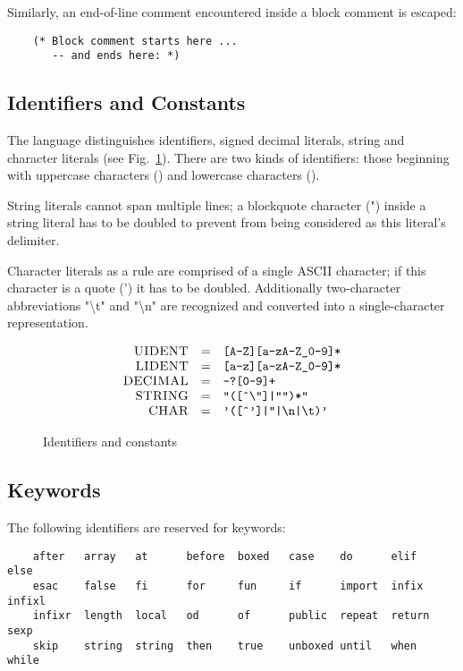 Similarly, an end-of-line comment encountered inside a block comment is escaped:

\begin{lstlisting}
    (* Block comment starts here ...
       -- and ends here: *)
\end{lstlisting}

\subsection{Identifiers and Constants}

The language distinguishes identifiers, signed decimal literals, string and character literals (see Fig.~\ref{idents_and_consts}). There are
two kinds of identifiers: those beginning with uppercase characters () and lowercase characters ().

String literals cannot span multiple lines; a blockquote character (") inside a string literal has to be doubled to prevent from
being considered as this literal's delimiter.

Character literals as a rule are comprised of a single \textsc{ASCII} character; if this character is a quote (') it has to be doubled. Additionally
two-character abbreviations "\textbackslash t" and "\textbackslash n" are recognized and converted into a single-character representation.

\begin{figure}[t]
  \[
  \begin{array}{rcl}
    \textsc{UIDENT} & = &\mbox{\texttt{[A-Z][a-zA-Z\_0-9]*}}\\
    \textsc{LIDENT} & = &\mbox{\texttt{[a-z][a-zA-Z\_0-9]*}}\\
    \textsc{DECIMAL}& = &\mbox{\texttt{-?[0-9]+}}\\
    \textsc{STRING} & = &\mbox{\texttt{"([\^{}\textbackslash"]|"")*"}}\\
    \textsc{CHAR}   & = &\mbox{\texttt{'([\^{}']|''|\textbackslash n|\textbackslash t)'}}
  \end{array}
  \]
  \caption{Identifiers and constants}
  \label{idents_and_consts}
\end{figure}


\subsection{Keywords}

The following identifiers are reserved for keywords:

\begin{lstlisting}
    after   array   at      before  boxed   case    do      elif    else
    esac    false   fi      for     fun     if      import  infix   infixl
    infixr  length  local   od      of      public  repeat  return  sexp
    skip    string  string  then    true    unboxed until   when    while
\end{lstlisting}

